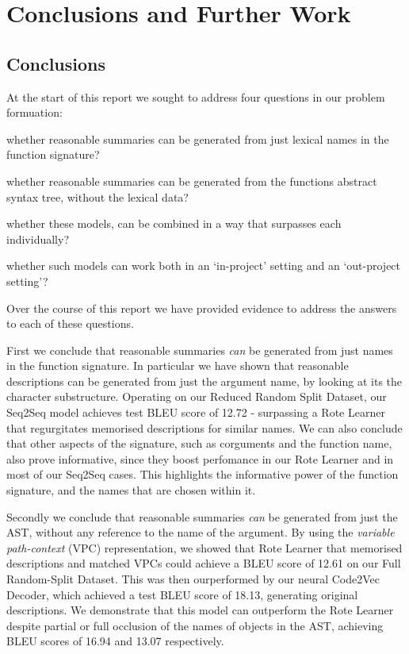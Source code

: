 \chapter{Conclusions and Further Work}
\label{chapterlabel4}


\section{Conclusions}

At the start of this report we sought to address four questions in our problem formuation:

\begin{tight_enumerate}
    \item whether reasonable summaries can be generated from just lexical names in the function signature?
    \item whether reasonable summaries can be generated from the functions abstract syntax tree, without the lexical data?
    \item whether these models, can be combined in a way that surpasses each individually?
    \item whether such models can work both in an `in-project' setting and an `out-project setting'?
\end{tight_enumerate}

Over the course of this report we have provided evidence to address the answers to each of these questions. 

First we conclude that reasonable summaries \textit{can} be generated from just names in the function signature. 
In particular we have shown that reasonable descriptions can be generated from just the argument name, by looking at its the character substructure. Operating on our Reduced Random Split Dataset, our Seq2Seq model achieves test BLEU score of 12.72 - surpassing a Rote Learner that regurgitates memorised descriptions for similar names.  
We can also conclude that other aspects of the signature, such as corguments and the function name, also prove informative, since they boost perfomance in our Rote Learner and in most of our Seq2Seq cases. 
This highlights the informative power of the function signature, and the names that are chosen within it.

Secondly we conclude that reasonable summaries \textit{can} be generated from just the AST, without any reference to the name of the argument. 
By using the \textit{variable path-context} (VPC) representation, we showed that Rote Learner that memorised descriptions and matched VPCs could achieve a BLEU score of 12.61 on our Full Random-Split Dataset. This was then ourperformed by our neural Code2Vec Decoder, which achieved a test BLEU score of 18.13, generating original descriptions. 
We demonstrate that this model can outperform the Rote Learner despite partial or full occlusion of the names of objects in the AST, achieving BLEU scores of 16.94 and 13.07 respectively.

